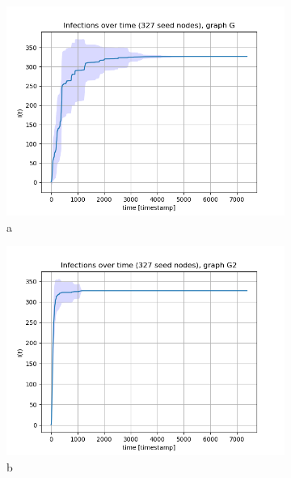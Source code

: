 \documentclass[letterpaper]{article}
\begin{document}
\begin{figure}
    \centering
    \begin{subfigure}[b]{0.32\textwidth}
        \includegraphics[width=\textwidth]{img/infections_G.png}
        \caption{a}
	    \label{fig:degree_distribution_linlin}
    \end{subfigure}
    \begin{subfigure}[b]{0.32\textwidth}
        \includegraphics[width=\textwidth]{img/infections_G2.png}
        \caption{b}
	    \label{fig:degree_distribution_loglog}
    \end{subfigure}
    \begin{subfigure}[b]{0.32\textwidth}

\end{subfigure}
\end{figure}
\end{document}
